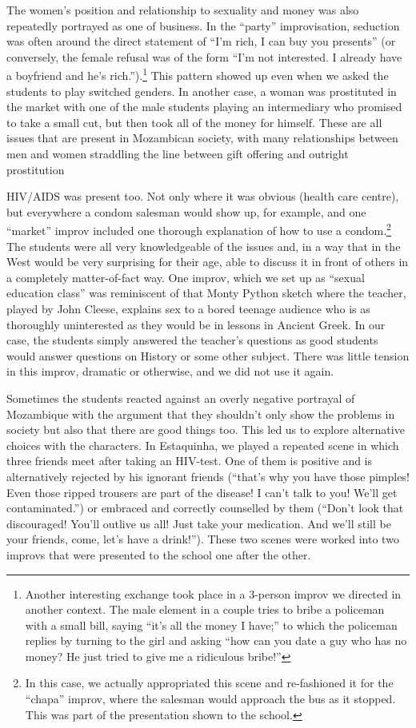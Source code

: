 \documentclass[article,twocolumn,twoside]{memoir}
\begin{document}
The women's position and relationship to sexuality and money was also
repeatedly portrayed as one of business. In the ``party'' improvisation,
seduction was often around the direct statement of ``I'm rich, I can buy you
presents'' (or conversely, the female refusal was of the form ``I'm not
interested. I already have a boyfriend and he's rich.'').\footnote{Another
interesting exchange took place in a 3-person improv we directed in another
context. The male element in a couple tries to bribe a policeman with a small
bill, saying ``it's all the money I have;'' to which the policeman replies by
turning to the girl and asking ``how can you date a guy who has no money? He
just tried to give me a ridiculous bribe!''} This pattern showed up even when
we asked the students to play switched genders. In another case, a woman was
prostituted in the market with one of the male students playing an intermediary
who promised to take a small cut, but then took all of the money for himself.
These are all issues that are present in Mozambican society, with many
relationships between men and women straddling the line between gift offering
and outright prostitution

HIV/AIDS was present too. Not only where it was obvious (health care centre),
but everywhere a condom salesman would show up, for example, and one ``market''
improv included one thorough explanation of how to use a condom.\footnote{In
this case, we actually appropriated this scene and re-fashioned it for the
``chapa'' improv, where the salesman would approach the bus as it stopped. This
was part of the presentation shown to the school.} The students were all
very knowledgeable of the issues and, in a way that in the West would be very
surprising for their age, able to discuss it in front of others in a completely
matter-of-fact way. One improv, which we set up as ``sexual education class''
was reminiscent of that Monty Python sketch where the teacher, played by John
Cleese, explains sex to a bored teenage audience who is as thoroughly
uninterested as they would be in lessons in Ancient Greek. In our case, the
students simply answered the teacher's questions as good students would answer
questions on History or some other subject. There was little tension in this
improv, dramatic or otherwise, and we did not use it again.

Sometimes the students reacted against an overly negative portrayal of
Mozambique with the argument that they shouldn't only show the problems in
society but also that there are good things too. This led us to explore
alternative choices with the characters. In Estaquinha, we played a repeated
scene in which three friends meet after taking an HIV-test. One of them is
positive and is alternatively rejected by his ignorant friends (``that's why
you have those pimples! Even those ripped trousers are part of the disease! I
can't talk to you! We'll get contaminated.'') or embraced and correctly
counselled by them (``Don't look that discouraged! You'll outlive us all! Just
take your medication. And we'll still be your friends, come, let's have a
drink!''). These two scenes were worked into two improvs that were presented to
the school one after the other.
\end{document}

